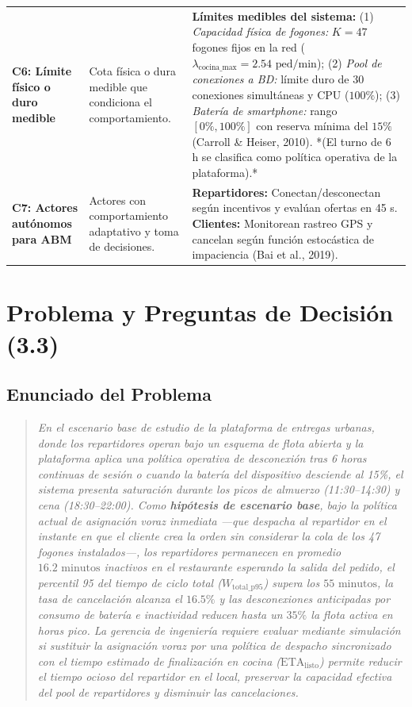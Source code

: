 \documentclass[11pt,letterpaper]{article}
\begin{document}
\begin{table}[htbp]
\begin{tabularx}{\textwidth}{p{3.2cm} p{3.8cm} X}
\addlinespace
\textbf{C6: Límite físico o duro medible} & Cota física o dura medible que condiciona el comportamiento. & \textbf{Límites medibles del sistema:} (1) \textit{Capacidad física de fogones:} $K = 47$ fogones fijos en la red ($\lambda_{\text{cocina\_max}} = 2.54\text{ ped/min}$); (2) \textit{Pool de conexiones a BD:} límite duro de 30 conexiones simultáneas y CPU ($100\%$); (3) \textit{Batería de smartphone:} rango $[0\%, 100\%]$ con reserva mínima del $15\%$ (Carroll \& Heiser, 2010). *(El turno de 6 h se clasifica como política operativa de la plataforma).* \\
\addlinespace
\textbf{C7: Actores autónomos para ABM} & Actores con comportamiento adaptativo y toma de decisiones. & \textbf{Repartidores:} Conectan/desconectan según incentivos y evalúan ofertas en 45 s. \textbf{Clientes:} Monitorean rastreo GPS y cancelan según función estocástica de impaciencia (Bai et al., 2019). \\
\bottomrule
\end{tabularx}
\end{table}

\section{Problema y Preguntas de Decisión (3.3)}

\subsection{Enunciado del Problema}
\begin{quote}
\textit{En el escenario base de estudio de la plataforma de entregas urbanas, donde los repartidores operan bajo un esquema de flota abierta y la plataforma aplica una política operativa de desconexión tras 6 horas continuas de sesión o cuando la batería del dispositivo desciende al 15\%, el sistema presenta saturación durante los picos de almuerzo (11:30–14:30) y cena (18:30–22:00). Como \textbf{hipótesis de escenario base}, bajo la política actual de asignación voraz inmediata —que despacha al repartidor en el instante en que el cliente crea la orden sin considerar la cola de los 47 fogones instalados—, los repartidores permanecen en promedio $16.2\text{ minutos}$ inactivos en el restaurante esperando la salida del pedido, el percentil 95 del tiempo de ciclo total ($W_{\text{total\_p95}}$) supera los $55\text{ minutos}$, la tasa de cancelación alcanza el $16.5\%$ y las desconexiones anticipadas por consumo de batería e inactividad reducen hasta un $35\%$ la flota activa en horas pico. La gerencia de ingeniería requiere evaluar mediante simulación si sustituir la asignación voraz por una política de despacho sincronizado con el tiempo estimado de finalización en cocina ($\text{ETA}_{\text{listo}}$) permite reducir el tiempo ocioso del repartidor en el local, preservar la capacidad efectiva del pool de repartidores y disminuir las cancelaciones.}
\end{quote}
\end{document}
